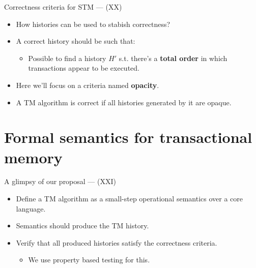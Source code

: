 \documentclass[14pt]{beamer}
\begin{document}
     \begin{frame}{Correctness criteria for STM --- (XX)}
        \begin{itemize}
           \item How histories can be used to stabish correctness?
           \item A correct history should be such that:
           \begin{itemize}
              \item Possible to find a history $H'$ s.t. there's
              a \textbf{total order} in which transactions appear to be executed.
           \end{itemize}
           \item Here we'll focus on a criteria named \textbf{opacity}.
           \item A TM algorithm is correct if all histories generated by it are
                 opaque.
        \end{itemize}
     \end{frame}
     \section{Formal semantics for transactional memory}
     \begin{frame}{A glimpsy of our proposal --- (XXI)}
        \begin{itemize}
            \item Define a TM algorithm as a small-step operational semantics over a
                  core language.
            \item Semantics should produce the TM history.
            \item Verify that all produced histories satisfy the
                  correctness criteria.
                  \begin{itemize}
                      \item We use property based testing for this.
                  \end{itemize}
        \end{itemize}
     \end{frame}
\end{document}
